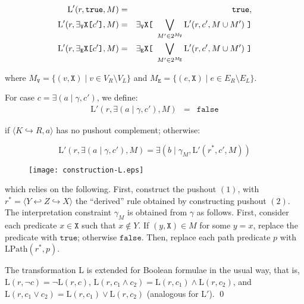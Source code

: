 \documentclass{llncs}
\newcommand{\mt}[1]{\text{\tt{#1}}}
\begin{document}
\begin{eqnarray*}
\text{L}'(r,\mathtt{true}, M) &=& \mathtt{true}, \\
\text{L}'(r,\exists_\mathtt{V}\mathtt{X}\mt{[}c'\mt{]}, M ) &=& \exists_\mathtt{V}\mathtt{X}\mt{[}\ \bigvee_{M'\in 2^{M_\mathtt{V}}}\text{L}'(r,c', M\cup M')\ \mt{]}\\
\text{L}'(r,\exists_\mathtt{E}\mathtt{X}\mt{[}c'\mt{]}, M ) &=& \exists_\mathtt{E}\mathtt{X}\mt{[}\ \bigvee_{M'\in 2^{M_\mathtt{E}}}\text{L}'(r,c', M\cup M')\ \mt{]}
\end{eqnarray*}

	\noindent where $M_\mathtt{V} = \{ (v,\mathtt{X}) \mid v \in V_R\setminus V_L \}$ and $M_\mathtt{E} = \{ (e,\mathtt{X}) \mid e \in E_R\setminus E_L \}$.
	
	For case $c = \exists(a\mid\gamma,c')$, we define:
	\begin{eqnarray*}
		\text{L}'(r,\exists(a\mid\gamma,c'),M) &=& \mathtt{false}
	\end{eqnarray*}	
	
	\noindent if $\langle K \hookrightarrow R, a \rangle$ has no pushout complement; otherwise:

	\[ \text{L}'(r,\exists(a\mid\gamma,c'),M) = \exists(b\mid\gamma_{M},\text{L}'(r^{*},c',M)) \]


	
	\begin{wrapfigure}[6]{r}{0.5\textwidth}
		\centering
			\vspace{-2.5pt}
			\texttt{[image: construction-L.eps]}
	\end{wrapfigure}
	\noindent which relies on the following. First, construct the pushout $(1)$, with $r^{*} = \langle Y \hookleftarrow Z \hookrightarrow X \rangle$ the ``derived'' rule obtained by constructing pushout $(2)$. The interpretation constraint $\gamma_{M}$ is obtained from $\gamma$ as follows. First, consider each predicate $x\in\mathtt{X}$ such that $x\notin Y$. If $(y,\mathtt{X})\in M$ for some $y=x$, replace the predicate with $\mathtt{true}$; otherwise $\mathtt{false}$. Then, replace each path predicate $p$ with $\text{LPath}(r^*,p)$.
	
	The transformation L is extended for Boolean formulae in the usual way, that is, $\text{L}(r,\neg c) = \neg \text{L}(r,c)$, $\text{L}(r,c_1\wedge c_2) = \text{L}(r,c_1) \wedge \text{L}(r,c_2)$, and $\text{L}(r,c_1\vee c_2) = \text{L}(r,c_1) \vee \text{L}(r,c_2)$ (analogous for $\text{L}'$).	
	\qed
\end{document}
